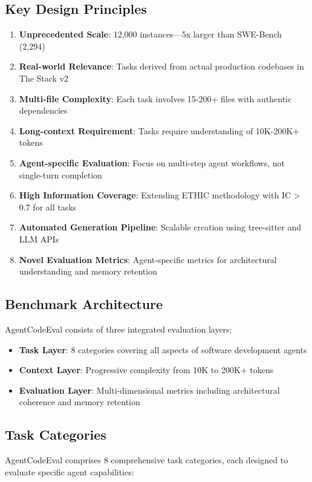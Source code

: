 \documentclass{article}
\begin{document}
\subsection{Key Design Principles}
\begin{enumerate}
    \item \textbf{Unprecedented Scale}: 12,000 instances—5x larger than SWE-Bench (2,294)
    \item \textbf{Real-world Relevance}: Tasks derived from actual production codebases in The Stack v2
    \item \textbf{Multi-file Complexity}: Each task involves 15-200+ files with authentic dependencies
    \item \textbf{Long-context Requirement}: Tasks require understanding of 10K-200K+ tokens
    \item \textbf{Agent-specific Evaluation}: Focus on multi-step agent workflows, not single-turn completion
    \item \textbf{High Information Coverage}: Extending ETHIC methodology with IC > 0.7 for all tasks
    \item \textbf{Automated Generation Pipeline}: Scalable creation using tree-sitter and LLM APIs
    \item \textbf{Novel Evaluation Metrics}: Agent-specific metrics for architectural understanding and memory retention
\end{enumerate}

\subsection{Benchmark Architecture}
AgentCodeEval consists of three integrated evaluation layers:
\begin{itemize}
    \item \textbf{Task Layer}: 8 categories covering all aspects of software development agents
    \item \textbf{Context Layer}: Progressive complexity from 10K to 200K+ tokens
    \item \textbf{Evaluation Layer}: Multi-dimensional metrics including architectural coherence and memory retention
\end{itemize}

\subsection{Task Categories}

AgentCodeEval comprises 8 comprehensive task categories, each designed to evaluate specific agent capabilities:
\end{document}

